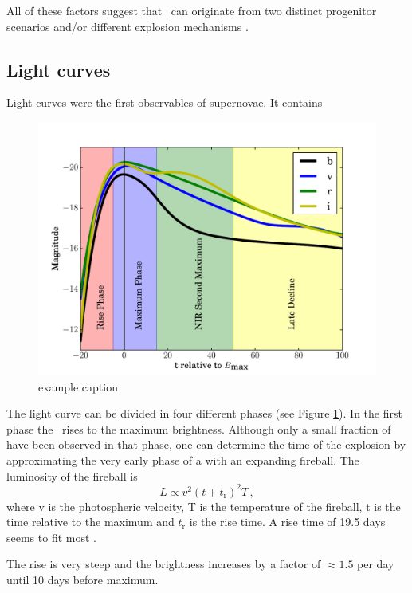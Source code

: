 All of these factors suggest that \sneia\ can originate from two distinct progenitor scenarios and/or different explosion mechanisms \citep{1994ApJ...423L..31D,  1995ApJ...447L..69R}.

\subsection{Light curves} 
Light curves were the first observables of supernovae. It contains


\begin{figure}[htbp] %
   \centering
   \includegraphics[width=\textwidth]{chapter_intro/plots/lightcurve_2002bo.pdf} 
   \caption{example caption}
   \label{fig:lightcurve_2002bo}
\end{figure}

The light curve can be divided in four different phases (see Figure \ref{fig:lightcurve_2002bo}). In the first phase the \sneia\  rises to the maximum brightness. Although only a small fraction of \sneia have been observed in that phase, one can determine the time of the explosion by approximating the very early phase of a \sneia with an expanding fireball. The luminosity of the fireball is 
\[L\propto v^2 (t+t_\textrm{r})^2 T\,,\]
where v is the photospheric velocity, T is the temperature of the fireball, t is the time relative to the maximum and $t_\textrm{r}$ is the rise time. A rise time of 19.5 days \citep{1999AJ....118.2675R} seems to fit most \sneia. 

The rise is very steep and the brightness increases by a factor of $\approx 1.5$ per day until 10 days before maximum. 

